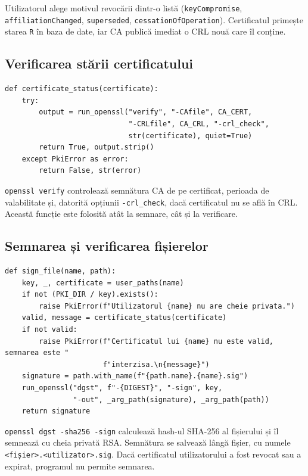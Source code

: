 \documentclass[12pt,a4paper]{article}
\begin{document}
Utilizatorul alege motivul revocării dintr-o listă (\texttt{keyCompromise},
\texttt{affiliationChanged}, \texttt{superseded},
\texttt{cessationOfOperation}). Certificatul primește starea \texttt{R} în baza
de date, iar CA publică imediat o CRL nouă care îl conține.

\subsection{Verificarea stării certificatului}

\begin{lstlisting}[caption={Verificarea certificatului față de CA și CRL}]
def certificate_status(certificate):
    try:
        output = run_openssl("verify", "-CAfile", CA_CERT,
                             "-CRLfile", CA_CRL, "-crl_check",
                             str(certificate), quiet=True)
        return True, output.strip()
    except PkiError as error:
        return False, str(error)
\end{lstlisting}

\texttt{openssl verify} controlează semnătura CA de pe certificat, perioada de
valabilitate și, datorită opțiunii \texttt{-crl\_check}, dacă certificatul nu se
află în CRL. Această funcție este folosită atât la semnare, cât și la
verificare.

\subsection{Semnarea și verificarea fișierelor}

\begin{lstlisting}[caption={Semnarea unui fișier}]
def sign_file(name, path):
    key, _, certificate = user_paths(name)
    if not (PKI_DIR / key).exists():
        raise PkiError(f"Utilizatorul {name} nu are cheie privata.")
    valid, message = certificate_status(certificate)
    if not valid:
        raise PkiError(f"Certificatul lui {name} nu este valid, semnarea este "
                       f"interzisa.\n{message}")
    signature = path.with_name(f"{path.name}.{name}.sig")
    run_openssl("dgst", f"-{DIGEST}", "-sign", key,
                "-out", _arg_path(signature), _arg_path(path))
    return signature
\end{lstlisting}

\texttt{openssl dgst -sha256 -sign} calculează hash-ul SHA-256 al fișierului și
îl semnează cu cheia privată RSA. Semnătura se salvează lângă fișier, cu numele
\texttt{<fișier>.<utilizator>.sig}. Dacă certificatul utilizatorului a fost
revocat sau a expirat, programul nu permite semnarea.
\end{document}
